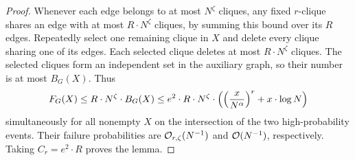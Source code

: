 \begin{proof}
    Whenever each edge belongs to at most $N^\zeta$ cliques, any fixed $r$-clique shares an edge with at most $R\cdot N^\zeta$ cliques, by summing this bound over its $R$ edges. Repeatedly select one remaining clique in $X$ and delete every clique sharing one of its edges. Each selected clique deletes at most $R\cdot N^\zeta$ cliques. The selected cliques form an independent set in the auxiliary graph, so their number is at most $B_G(X)$. Thus
    \[
        F_G(X)\leq R \cdot N^\zeta \cdot B_G(X)
        \leq e^2\cdot R \cdot N^\zeta \cdot \mathopen{}\left( \mathopen{}\left( \frac{x}{N^\alpha} \right)^r+x \cdot \log N \right)
    \]
    simultaneously for all nonempty $X$ on the intersection of the two high-probability events. Their failure probabilities are $\mathcal{O}_{r,\zeta}(N^{-1})$ and $\mathcal{O}(N^{-1})$, respectively. Taking $C_r=e^2\cdot R$ proves the lemma.
\end{proof}

